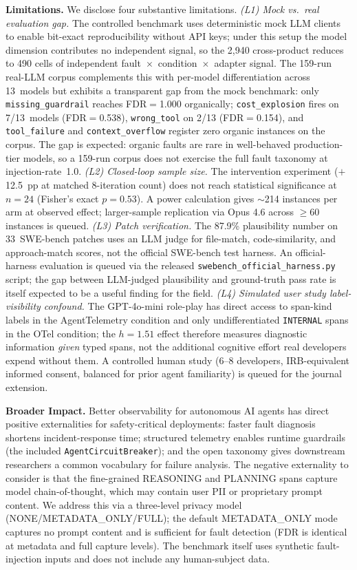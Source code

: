 \documentclass{article}
\begin{document}
\textbf{Limitations.}
We disclose four substantive limitations.
\emph{(L1) Mock vs.\ real evaluation gap.} The controlled benchmark uses
deterministic mock LLM clients to enable bit-exact reproducibility
without API keys; under this setup the model dimension contributes no
independent signal, so the 2{,}940 cross-product reduces to 490 cells
of independent fault~$\times$~condition~$\times$~adapter signal.
The 159-run real-LLM corpus complements this with per-model
differentiation across 13~models but exhibits a transparent gap from
the mock benchmark: only \texttt{missing\_guardrail} reaches FDR$=$1.000
organically; \texttt{cost\_explosion} fires on 7/13~models (FDR$=$0.538),
\texttt{wrong\_tool} on 2/13 (FDR$=$0.154), and \texttt{tool\_failure}
and \texttt{context\_overflow} register zero organic instances on the
corpus.  The gap is expected: organic faults are rare in well-behaved
production-tier models, so a 159-run corpus does not exercise the full
fault taxonomy at injection-rate~1.0.
\emph{(L2) Closed-loop sample size.} The intervention experiment
($+$12.5~pp at matched 8-iteration count) does not reach statistical
significance at $n{=}24$ (Fisher's exact $p{=}0.53$).  A power
calculation gives $\sim$214 instances per arm at observed effect;
larger-sample replication via Opus 4.6 across $\geq{}60$ instances is
queued.
\emph{(L3) Patch verification.} The 87.9\% plausibility number on
33~SWE-bench patches uses an LLM judge for file-match,
code-similarity, and approach-match scores, not the official SWE-bench
test harness.  An official-harness evaluation is queued via the
released \texttt{swebench\_official\_harness.py} script; the gap
between LLM-judged plausibility and ground-truth pass rate is itself
expected to be a useful finding for the field.
\emph{(L4) Simulated user study label-visibility confound.} The
GPT-4o-mini role-play has direct access to span-kind labels in the
AgentTelemetry condition and only undifferentiated \texttt{INTERNAL}
spans in the OTel condition; the $h{=}1.51$ effect therefore measures
diagnostic information \emph{given} typed spans, not the additional
cognitive effort real developers expend without them.  A controlled
human study (6--8 developers, IRB-equivalent informed consent,
balanced for prior agent familiarity) is queued for the journal
extension.

\textbf{Broader Impact.}
Better observability for autonomous AI agents has direct positive
externalities for safety-critical deployments: faster fault diagnosis
shortens incident-response time; structured telemetry enables runtime
guardrails (the included \texttt{AgentCircuitBreaker}); and the open
taxonomy gives downstream researchers a common vocabulary for failure
analysis.  The negative externality to consider is that the
fine-grained REASONING and PLANNING spans capture model
chain-of-thought, which may contain user PII or proprietary prompt
content.  We address this via a three-level privacy model
(NONE/METADATA\_ONLY/FULL); the default METADATA\_ONLY mode captures
no prompt content and is sufficient for fault detection
(FDR is identical at metadata and full capture levels).  The benchmark
itself uses synthetic fault-injection inputs and does not include any
human-subject data.
\end{document}
